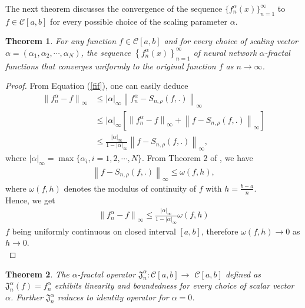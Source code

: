 \documentclass{article}[12pt, a4]
\newtheorem{theorem}{\large Theorem}[section]
\begin{document}
	
	
	The next theorem discusses the convergence of the sequence \( \{f_n^\alpha(x)\}_{n=1}^\infty \) to \( f \in \mathcal{C}[a, b] \) for every possible choice of the scaling parameter \( \alpha \).\\
	
	
	\begin{theorem}\label{Thm3}
		For any function $f\in\mathcal{C}[a,b]$ and for every choice of scaling vector $\alpha=(\alpha_{1}, \alpha_{2}, \cdots, \alpha_{N})$, the sequence $\left\{f_{n}^{\alpha}(x)\right\}_{n=1}^{\infty}$ of neural network $\alpha$-fractal functions that converges uniformly to the original function $f$ as $n\rightarrow \infty$.
	\end{theorem}
	\begin{proof}
		From Equation (\ref{fif}), one can easily deduce 
		\begin{align*}
			\left\|f_{n}^{\alpha}-f\right\|_{\infty} & \leq|\alpha|_{\infty}\left\|f_{n}^{\alpha}-S_{n,\rho}(f, .)\right\|_{\infty} \\
			& \leq|\alpha|_{\infty}\left[\left\|f_{n}^{\alpha}-f\right\|_{\infty}+\left\|f-S_{n,\rho}(f, .)\right\|_{\infty}\right]\\
			&\leq \frac{|\alpha|_{\infty}}{1-|\alpha|_{\infty}}\left\|f-S_{n,\rho}(f, .)\right\|_{\infty},
		\end{align*}
		where $|\alpha|_\infty =\max \{\alpha_{i}, i=1,2,\cdots, N\}$.
		From Theorem 2 of \cite{QIAN2022126781}, we have 
		\begin{align*}
			\left\|f-S_{n,\rho}(f, .)\right\|_{\infty}\leq \omega(f,h),
		\end{align*}
		where $\omega(f,h)$ denotes the modulus of continuity\cite{Anastassiou2000} of $f$ with $h=\frac{b-a}{n}$.\\
		Hence, we get  
		\begin{align*}
			\left\|f_{n}^{\alpha}-f\right\|_{\infty} \leq \frac{|\alpha|_{\infty}}{1-|\alpha|_{\infty}}  \omega\left(f,h\right) 
		\end{align*}
		$f$ being  uniformly continuous on closed interval $[a,b]$, therefore $\omega\left(f,h\right)\rightarrow 0 $ as $h\rightarrow 0$.\\
	\end{proof}
	
	
	\begin{theorem}
		The $\alpha$-fractal operator $\mathfrak{J}_{n}^{\alpha}: \mathcal{C}[a,b] \rightarrow$ $\mathcal{C}[a,b]$ defined as $\mathfrak{J}_{n}^{\alpha}(f)=f_{n}^{\alpha}$ exhibits linearity and boundedness for every choice of scalar vector $\alpha$. Further $\mathfrak{J}_{n}^{\alpha}$ reduces to identity operator for $\alpha=0$.
	\end{theorem}
	
\end{document}
